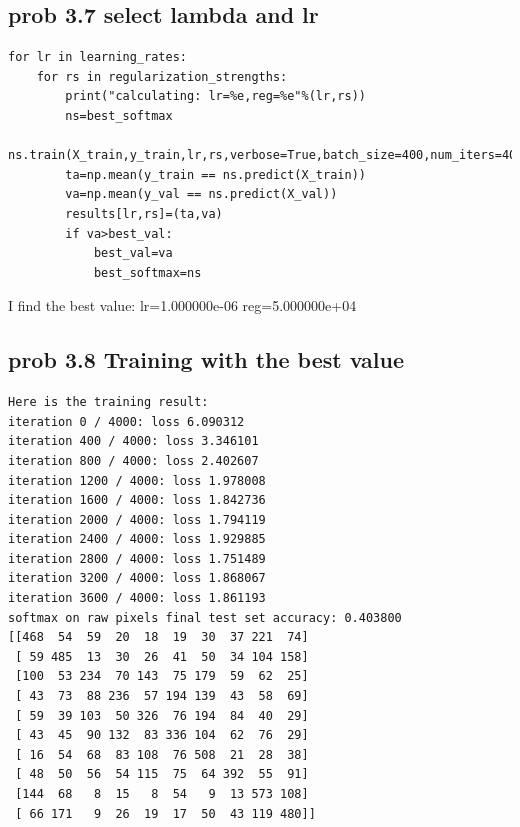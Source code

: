 \documentclass[pdftex,11pt]{article}
\begin{document}
\subsection{prob 3.7 select lambda and lr}
\begin{lstlisting} 
for lr in learning_rates:
    for rs in regularization_strengths:
        print("calculating: lr=%e,reg=%e"%(lr,rs))
        ns=best_softmax
        ns.train(X_train,y_train,lr,rs,verbose=True,batch_size=400,num_iters=4000)
        ta=np.mean(y_train == ns.predict(X_train))
        va=np.mean(y_val == ns.predict(X_val))
        results[lr,rs]=(ta,va)
        if va>best_val:
            best_val=va
            best_softmax=ns
\end{lstlisting} 
I find the best value:
lr=1.000000e-06 
reg=5.000000e+04
\subsection{prob 3.8 Training with the best value}
\begin{lstlisting} 
Here is the training result:
iteration 0 / 4000: loss 6.090312
iteration 400 / 4000: loss 3.346101
iteration 800 / 4000: loss 2.402607
iteration 1200 / 4000: loss 1.978008
iteration 1600 / 4000: loss 1.842736
iteration 2000 / 4000: loss 1.794119
iteration 2400 / 4000: loss 1.929885
iteration 2800 / 4000: loss 1.751489
iteration 3200 / 4000: loss 1.868067
iteration 3600 / 4000: loss 1.861193
softmax on raw pixels final test set accuracy: 0.403800
[[468  54  59  20  18  19  30  37 221  74]
 [ 59 485  13  30  26  41  50  34 104 158]
 [100  53 234  70 143  75 179  59  62  25]
 [ 43  73  88 236  57 194 139  43  58  69]
 [ 59  39 103  50 326  76 194  84  40  29]
 [ 43  45  90 132  83 336 104  62  76  29]
 [ 16  54  68  83 108  76 508  21  28  38]
 [ 48  50  56  54 115  75  64 392  55  91]
 [144  68   8  15   8  54   9  13 573 108]
 [ 66 171   9  26  19  17  50  43 119 480]]
\end{lstlisting} 
\end{document}
